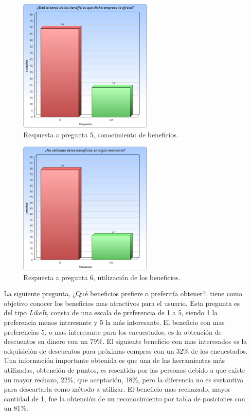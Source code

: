 \begin{figure}[!htb]
    \centering
    \includegraphics[width=0.6\textwidth]{images/Graficos/graf_5_3.png}
    \caption[chart5.3]{Respuesta a pregunta 5, conocimiento de beneficios.}
    \label{fig:chart5.3}
\end{figure}

\begin{figure}[!htb]
    \centering
    \includegraphics[width=0.6\textwidth]{images/Graficos/graf_5_4.png}
    \caption[chart5.4]{Respuesta a pregunta 6, utilización de los beneficios.}
    \label{fig:chart5.4}
\end{figure}


La siguiente pregunta,
¿Qué beneficios prefiere o preferiría obtener?,
tiene como objetivo conocer los  beneficios mas atractivos para el usuario.
Esta pregunta es del tipo \emph{LikeIt}, consta de una escala de preferencia de
1 a 5, siendo 1 la preferencia menos interesante y 5 la más interesante.
El beneficio con mas preferencias 5, o mas interesante para los encuestados,
es la obtención de descuentos en dinero con un 79\%.
El siguiente beneficio con mas interesados es la adquisición de descuentos para
próximas compras con un 32\% de los encuestados.
Una información importante obtenida es que una de las herramientas más utilizadas,
obtención de puntos, es resentida por las personas debido a que existe un mayor
rechazo, 22\%, que aceptación, 18\%, pero la diferencia no es sustantiva para
descartarla como método a utilizar.
El beneficio mas rechazado, mayor cantidad de 1, fue la obtención de un
reconocimiento por tabla de posiciones con un 81\%.

